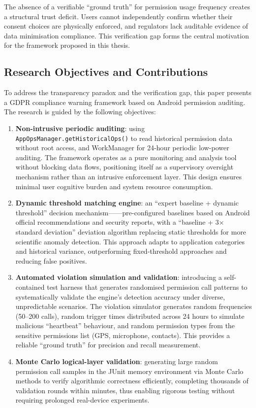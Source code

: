 The absence of a verifiable ``ground truth'' for permission usage frequency creates a structural trust deficit. Users cannot independently confirm whether their consent choices are physically enforced, and regulators lack auditable evidence of data minimisation compliance. This verification gap forms the central motivation for the framework proposed in this thesis.

\subsection{Research Objectives and Contributions}

To address the transparency paradox and the verification gap, this paper presents a GDPR compliance warning framework based on Android permission auditing. The research is guided by the following objectives:

\begin{enumerate}
\item \textbf{Non-intrusive periodic auditing}: using \texttt{AppOpsManager.getHistoricalOps()} to read historical permission data without root access, and WorkManager for 24-hour periodic low-power auditing. The framework operates as a pure monitoring and analysis tool without blocking data flows, positioning itself as a supervisory oversight mechanism rather than an intrusive enforcement layer. This design ensures minimal user cognitive burden and system resource consumption.
\item \textbf{Dynamic threshold matching engine}: an ``expert baseline + dynamic threshold'' decision mechanism——pre-configured baselines based on Android official recommendations and security reports, with a ``baseline + 3× standard deviation'' deviation algorithm replacing static thresholds for more scientific anomaly detection. This approach adapts to application categories and historical variance, outperforming fixed-threshold approaches and reducing false positives.
\item \textbf{Automated violation simulation and validation}: introducing a self-contained test harness that generates randomised permission call patterns to systematically validate the engine's detection accuracy under diverse, unpredictable scenarios. The violation simulator generates random frequencies (50--200 calls), random trigger times distributed across 24 hours to simulate malicious ``heartbeat'' behaviour, and random permission types from the sensitive permissions list (GPS, microphone, contacts). This provides a reliable ``ground truth'' for precision and recall measurement.
\item \textbf{Monte Carlo logical-layer validation}: generating large random permission call samples in the JUnit memory environment via Monte Carlo methods to verify algorithmic correctness efficiently, completing thousands of validation rounds within minutes, thus enabling rigorous testing without requiring prolonged real-device experiments.
\end{enumerate}

